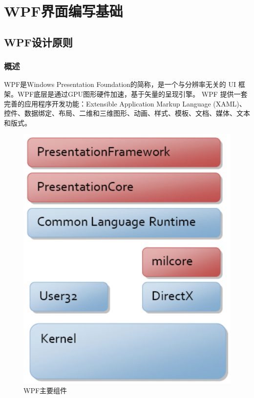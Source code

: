 
\chapter{WPF界面编写基础}

\section{WPF设计原则}

\subsection{概述}
WPF是Windows Presentation Foundation的简称，是一个与分辨率无关的 UI 框架。WPF底层是通过GPU图形硬件加速，基于矢量的呈现引擎。 WPF 提供一套完善的应用程序开发功能：Extensible Application Markup Language (XAML)、控件、数据绑定、布局、二维和三维图形、动画、样式、模板、文档、媒体、文本和版式。

\begin{figure}[htbp]
    \centering
    \includegraphics[scale=1]{chapter/uibase/wpf.png}
    \caption{WPF主要组件}
    \label{fig:wpf}
\end{figure}

